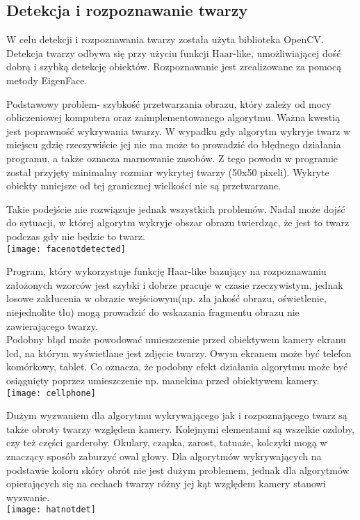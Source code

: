 \documentclass[eng,printmode]{mgr}
\begin{document}
\subsection{Detekcja i rozpoznawanie twarzy}
W celu detekcji i rozpoznawania twarzy została użyta biblioteka OpenCV. Detekcja twarzy odbywa się przy użyciu funkcji Haar-like, umożliwiającej dość dobrą i szybką detekcję obiektów. Rozpoznawanie jest zrealizowane za pomocą metody EigenFace.

Podstawowy problem- szybkość przetwarzania obrazu, który zależy od mocy obliczeniowej komputera oraz zaimplementowanego algorytmu. Ważna kwestią jest poprawność wykrywania twarzy. W wypadku gdy algorytm wykryje twarz w miejscu gdzię rzeczywiście jej nie ma może to prowadzić do błędnego działania programu, a także oznacza marnowanie zasobów. Z tego powodu w programie został przyjęty minimalny rozmiar wykrytej twarzy (50x50 pixeli). Wykryte obiekty mniejsze od tej granicznej wielkości nie są przetwarzane.

Takie podejście nie rozwiązuje jednak wszystkich problemów. Nadal może dojść do sytuacji, w której algorytm wykryje obszar obrazu twierdząc, że jest to twarz podczas gdy nie będzie to twarz.\\
\texttt{[image: facenotdetected]}

Program, który wykorzystuje funkcję Haar-like bazujący na rozpoznawaniu założonych wzorców jest szybki i dobrze pracuje w czasie rzeczywistym, jednak losowe zakłucenia w obrazie wejściowym(np. zła jakość obrazu, oświetlenie, niejednolite tło) mogą prowadzić do wskazania fragmentu obrazu nie zawierającego twarzy.\\

Podobny błąd może powodować umieszczenie przed obiektywem kamery ekranu lcd, na którym wyświetlane jest zdjęcie twarzy. Owym ekranem może być telefon komórkowy, tablet. Co oznacza, że podobny efekt działania algorytmu może być osiągnięty poprzez umieszczenie np. manekina przed obiektywem kamery.\\
\texttt{[image: cellphone]}

Dużym wyzwaniem dla algorytmu wykrywającego jak i rozpoznającego twarz są także obroty twarzy względem kamery. Kolejnymi elementami są wszelkie ozdoby, czy też części garderoby. Okulary, czapka, zarost, tatuaże, kolczyki mogą w znaczący sposób zaburzyć owal głowy. Dla algorytmów wykrywających na podstawie koloru skóry obrót nie jest dużym problemem, jednak dla algorytmów opierających się na cechach twarzy różny jej kąt względem kamery stanowi wyzwanie.\\
\texttt{[image: hatnotdet]}
\end{document}

